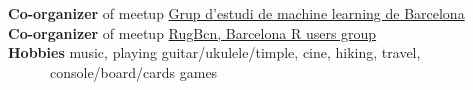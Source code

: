 \documentclass[a4paper, oneside]{scrreprt}
\begin{document}
\noindent\makebox[\linewidth]{\rule{\textwidth}{0.4pt}}

\vspace{0.3cm}

\noindent
\begin{minipage}{0.9\textwidth}
  \noindent\llap{\FA \faCar\ \ }\textbf{Co-organizer} of meetup
  \href{https://www.meetup.com/Grup-destudid-e-machine-learning-de-Barcelona/}
  {Grup d'estudi de machine learning de Barcelona}\\
  \noindent\llap{\FA \faAreaChart\ \ }\textbf{Co-organizer} of meetup
  \href{https://www.meetup.com/RugBcn-Barcelona-R-users-group/}{RugBcn, Barcelona R users group}\\
  \noindent\llap{\FA \faMusic\ \ }\textbf{Hobbies}
  music, playing guitar/ukulele/timple, cine, hiking, travel, \\
  \ \ \ \ \ \ console/board/cards games \\
\end{minipage}\hfill
{}
\ \\
\noindent\makebox[\linewidth]{\rule{\textwidth}{0.4pt}}
\end{document}
